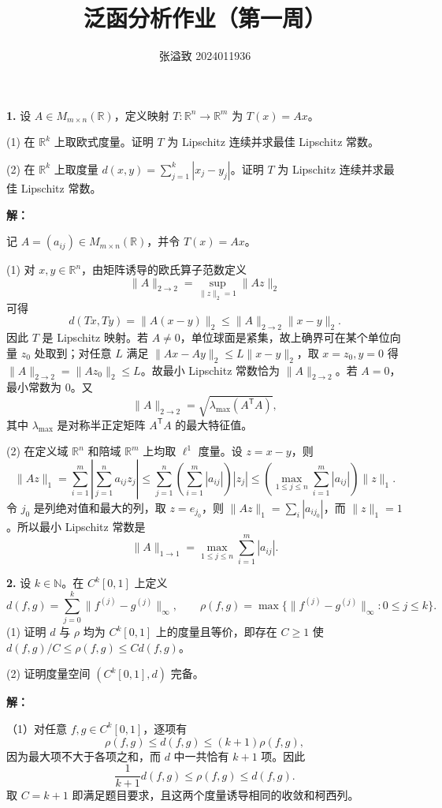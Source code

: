 \documentclass{article}
\title{泛函分析作业（第一周）}
\author{张溢致 2024011936}
\begin{document}
\maketitle

\textbf{1.} 设 $A\in M_{m\times n}(\mathbb R)$，定义映射 $T:\mathbb R^n\to\mathbb R^m$ 为 $T(x)=Ax$。

(1) 在 $\mathbb R^k$ 上取欧式度量。证明 $T$ 为 Lipschitz 连续并求最佳 Lipschitz 常数。

(2) 在 $\mathbb R^k$ 上取度量 $d(x,y)=\sum_{j=1}^k|x_j-y_j|$。证明 $T$ 为 Lipschitz 连续并求最佳 Lipschitz 常数。

\textbf{解：}

记 $A=(a_{ij})\in M_{m\times n}(\mathbb R)$，并令 $T(x)=Ax$。

(1) 对 $x,y\in\mathbb R^n$，由矩阵诱导的欧氏算子范数定义
\[
\|A\|_{2\to2}=\sup_{\|z\|_2=1}\|Az\|_2
\]
可得
\[
d(Tx,Ty)=\|A(x-y)\|_2\leq \|A\|_{2\to2}\|x-y\|_2.
\]
因此 $T$ 是 Lipschitz 映射。若 $A\ne0$，单位球面是紧集，故上确界可在某个单位向量 $z_0$ 处取到；对任意 $L$ 满足
\(\|Ax-Ay\|_2\leq L\|x-y\|_2\)，取 $x=z_0,y=0$ 得
\(\|A\|_{2\to2}=\|Az_0\|_2\leq L\)。故最小 Lipschitz 常数恰为 $\|A\|_{2\to2}$。若 $A=0$，最小常数为 $0$。又
\[
\|A\|_{2\to2}=\sqrt{\lambda_{\max}(A^{\mathsf T}A)},
\]
其中 $\lambda_{\max}$ 是对称半正定矩阵 $A^{\mathsf T}A$ 的最大特征值。

(2) 在定义域 $\mathbb R^n$ 和陪域 $\mathbb R^m$ 上均取 $\ell^1$ 度量。设 $z=x-y$，则
\[
\|Az\|_1=\sum_{i=1}^m\left|\sum_{j=1}^n a_{ij}z_j\right|
\leq\sum_{j=1}^n\left(\sum_{i=1}^m|a_{ij}|\right)|z_j|
\leq\left(\max_{1\leq j\leq n}\sum_{i=1}^m|a_{ij}|\right)\|z\|_1.
\]
令 $j_0$ 是列绝对值和最大的列，取 $z=e_{j_0}$，则
\(\|Az\|_1=\sum_i|a_{ij_0}|\)，而 $\|z\|_1=1$。所以最小 Lipschitz 常数是
\[
\|A\|_{1\to1}=\max_{1\leq j\leq n}\sum_{i=1}^m|a_{ij}|.
\]

\textbf{2.} 设 $k\in\mathbb N$。在 $C^k[0,1]$ 上定义
\[
d(f,g)=\sum_{j=0}^k\|f^{(j)}-g^{(j)}\|_\infty,\qquad
\rho(f,g)=\max\{\|f^{(j)}-g^{(j)}\|_\infty:0\leq j\leq k\}.
\]
(1) 证明 $d$ 与 $\rho$ 均为 $C^k[0,1]$ 上的度量且等价，即存在 $C\geq1$ 使 $d(f,g)/C\leq\rho(f,g)\leq Cd(f,g)$。

(2) 证明度量空间 $(C^k[0,1],d)$ 完备。

\textbf{解：}

（1）对任意 $f,g\in C^k[0,1]$，逐项有
\[
\rho(f,g)\leq d(f,g)\leq (k+1)\rho(f,g),
\]
因为最大项不大于各项之和，而 $d$ 中一共恰有 $k+1$ 项。因此
\[
\frac{1}{k+1}d(f,g)\leq\rho(f,g)\leq d(f,g).
\]
取 $C=k+1$ 即满足题目要求，且这两个度量诱导相同的收敛和柯西列。
\end{document}
